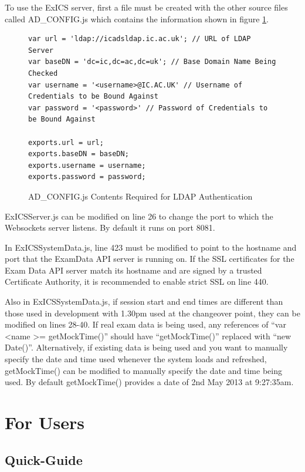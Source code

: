 To use the ExICS server, first a file must be created with the other source files called AD\_CONFIG.js which contains the information shown in figure \ref{fig:ad_conf}.

\begin{figure}[!htbp]
\centering
\lstset{language=JavaScript}
\begin{lstlisting}[tabsize=2,breaklines=true]
var url = 'ldap://icadsldap.ic.ac.uk'; // URL of LDAP Server
var baseDN = 'dc=ic,dc=ac,dc=uk'; // Base Domain Name Being Checked
var username = '<username>@IC.AC.UK' // Username of Credentials to be Bound Against
var password = '<password>' // Password of Credentials to be Bound Against

exports.url = url;
exports.baseDN = baseDN;
exports.username = username;
exports.password = password;
\end{lstlisting}
\caption{AD\_CONFIG.js Contents Required for LDAP Authentication}
\label{fig:ad_conf}
\end{figure}

ExICSServer.js can be modified on line 26 to change the port to which the Websockets server listens.  By default it runs on port 8081.

In ExICSSystemData.js, line 423 must be modified to point to the hostname and port that the ExamData API server is running on.  If the SSL certificates for the Exam Data API server match its hostname and are signed by a trusted Certificate Authority, it is recommended to enable strict SSL on line 440.

Also in ExICSSystemData.js, if session start and end times are different than those used in development with 1.30pm used at the changeover point, they can be modified on lines 28-40.  If real exam data is being used, any references of ``var \textless name \textgreater = getMockTime()'' should have ``getMockTime()'' replaced with ``new Date()''.  Alternatively, if existing data is being used and you want to manually specify the date and time used whenever the system loads and refreshed, getMockTime() can be modified to manually specify the date and time being used.  By default getMockTime() provides a date of 2nd May 2013 at 9:27:35am.

\section{For Users}

\subsection{Quick-Guide}

